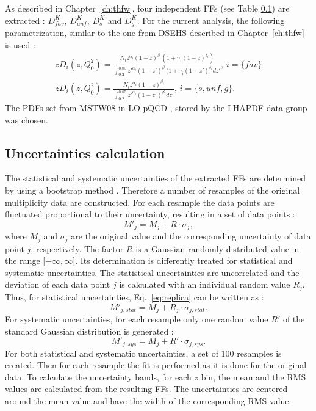 As described in Chapter~\ref{ch:thfw}, four independent FFs (see Table \ref{}) are extracted : $D^K_{fav}$, $D^K_{unf}$, $D^K_{s}$ and $D^K_{g}$.
For the current analysis, the following parametrization, similar to the one from DSEHS described in Chapter~\ref{ch:thfw} is used :
%
\begin{equation}
  \begin{split}
    zD_i(z,Q^2_0) = \frac{N_i z^{\alpha_i} (1-z)^{\beta_i} (1+\gamma_i(1-z)^{\delta_i})}{\int_{0.2}^{0.85} z'^{\alpha_i} (1-z')^{\beta_i} (1+\gamma_i(1-z')^{\delta_i} dz'},\,i=\{fav\} \\
    zD_i(z,Q^2_0) = \frac{N_i z^{\alpha_i} (1-z)^{\beta_i}}{\int_{0.2}^{0.85} z'^{\alpha_i} (1-z')^{\beta_i} dz'},\,i=\{s,unf,g\}.
  \end{split}
\end{equation}
%
The PDFs set from MSTW$08$ in LO pQCD \cite{MSTW08}, stored by the LHAPDF data group \cite{LHAPDF} was chosen.

\subsection{Uncertainties calculation}

The statistical and systematic uncertainties of the extracted FFs are determined by using a bootstrap method \cite{replicas}. Therefore a number of resamples of the original multiplicity data are constructed. For each resample the data points are fluctuated proportional to their uncertainty, resulting in a set of data points :
%
\begin{equation}\label{eq:replica}
  M'_j = M_j + R \cdot \sigma_j,
\end{equation}
%
where $M_j$ and $\sigma_j$ are the original value and the corresponding uncertainty of data point $j$, respectively. The factor $R$ is a Gaussian randomly distributed value in the range [$-\infty,\infty$]. Its determination is differently treated for statistical and systematic uncertainties.
The statistical uncertainties are uncorrelated and the deviation of each data point $j$ is calculated with an individual random value $R_j$. Thus, for statistical uncertainties, Eq.~\ref{eq:replica} can be written as :
%
\begin{equation}\label{eq:replica}
  M'_{j,stat} = M_j + R_j \cdot \sigma_{j,stat}.
\end{equation}
%
For systematic uncertainties, for each resample only one random value $R'$ of the standard Gaussian distribution is generated :
%
\begin{equation}\label{eq:replica}
  M'_{j,sys} = M_j + R' \cdot \sigma_{j,sys}.
\end{equation}
%
For both statistical and systematic uncertainties, a set of $100$ resamples is created. Then for each resample the fit is performed as it is done for the original data. To calculate the uncertainty bands, for each $z$ bin, the mean and the RMS values are calculated from the resulting FFs. The uncertainties are centered around the mean value and have the width of the corresponding RMS value.

